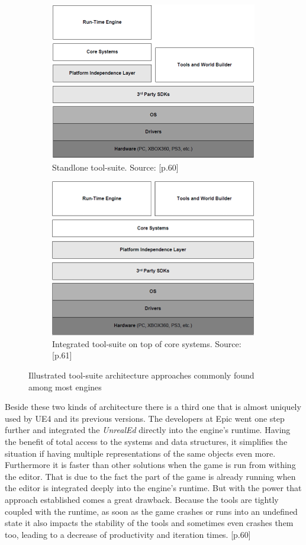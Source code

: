 \begin{figure}[!ht]
	\begin{subfigure}{0.5\textwidth}
		\centering
		\centering \includegraphics[width=0.5 \linewidth]{PICs/tools_arch_standalone.png}
		\caption{Standlone tool-suite. Source: \cite{GEA_2}[p.60]}
		\label{fig:tools_standalone}
	\end{subfigure}%
	\begin{subfigure}{0.5\textwidth}
		\centering
		\centering \includegraphics[width=0.5 \linewidth]{PICs/tools_arch_integrated.png}
		\caption{Integrated tool-suite on top of core systems. Source: \cite{GEA_2}[p.61]}
		\label{fig:tools_integrated}
	\end{subfigure}
	
	\caption{Illustrated tool-suite architecture approaches commonly found among most engines}
\end{figure}

\noindent 
Beside these two kinds of architecture there is a third one that is almost uniquely used by \ac{UE4} and its previous versions. The developers at Epic went one step further and integrated the \textit{UnrealEd} directly into the engine's runtime. Having the benefit of total access to the systems and data structures, it simplifies the situation if having multiple representations of the same objects even more. Furthermore it is faster than other solutions when the game is run from withing the editor. That is due to the fact the part of the game is already running when the editor is integrated deeply into the engine's runtime. But with the power that approach established comes a great drawback. Because the tools are tightly coupled with the runtime, as soon as the game crashes or runs into an undefined state it also impacts the stability of the tools and sometimes even crashes them too, leading to a decrease of productivity and iteration times. \cite{GEA_2}[p.60]

